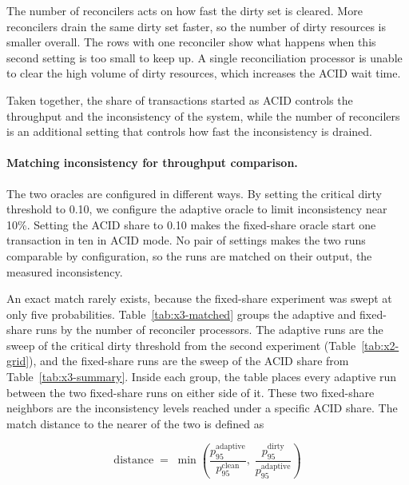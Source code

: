 The number of reconcilers acts on how fast the dirty set is cleared. More
reconcilers drain the same dirty set faster, so the number of dirty resources is
smaller overall. The rows with one reconciler show
what happens when this second setting is too small to keep up. A single
reconciliation processor is unable to clear the high volume of dirty resources,
which increases the ACID wait time.

Taken together, the share of transactions started as ACID
controls the throughput and the inconsistency of the system, while the number
of reconcilers is an additional setting that controls how fast
the inconsistency is drained.


\paragraph{Matching inconsistency for throughput
  comparison.}\label{sec:x3-frontier} The two oracles are configured in
different ways. By setting the critical dirty threshold to 0.10, we configure
the adaptive oracle to limit inconsistency near 10\%. Setting the ACID share
to 0.10 makes the fixed-share oracle start one transaction in ten in ACID
mode. No pair of settings makes the two runs comparable by
configuration, so the runs are matched on their output, the measured
inconsistency.

An exact match rarely exists, because the fixed-share experiment was swept at
only five probabilities. Table~\ref{tab:x3-matched} groups the adaptive and
fixed-share runs by the number of reconciler processors. The adaptive runs are the
sweep of the critical dirty threshold from the second experiment (Table~\ref{tab:x2-grid}), and
the fixed-share runs are the sweep of the ACID share from
Table~\ref{tab:x3-summary}. Inside each group,
the table places every adaptive run between the two fixed-share
runs on either side of it. These two fixed-share neighbors are the inconsistency
levels reached under a specific ACID share. The match
distance to the nearer of the two is defined as

\[
  \mathrm{distance} \;=\; \min\!\left(
  \frac{p_{95}^{\mathrm{adaptive}}}{p_{95}^{\mathrm{clean}}},\;
  \frac{p_{95}^{\mathrm{dirty}}}{p_{95}^{\mathrm{adaptive}}}
  \right)
\]

